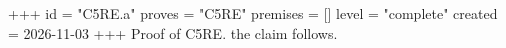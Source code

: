 +++
id = "C5RE.a"
proves = "C5RE"
premises = []
level = "complete"
created = 2026-11-03
+++
Proof of C5RE. the claim follows.
